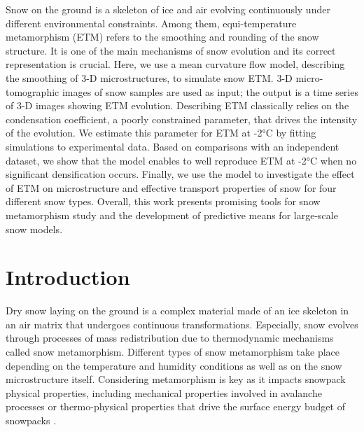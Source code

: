 \documentclass[draft,ms]{agujournal2019}
\begin{document}
Snow on the ground is a skeleton of ice and air evolving continuously under different environmental constraints. Among them, equi-temperature metamorphism (ETM) refers to the smoothing and rounding of the snow structure. It is one of the main mechanisms of snow evolution and its correct representation is crucial. Here, we use a mean curvature flow model, describing the smoothing of 3-D microstructures, to simulate snow ETM. 3-D micro-tomographic images of snow samples are used as input; the output is a time series of 3-D images showing ETM evolution. Describing ETM classically relies on the condensation coefficient, a poorly constrained parameter, that drives the intensity of the evolution. We estimate this parameter for ETM at -2°C by fitting simulations to experimental data. Based on comparisons with an independent dataset, we show that the model enables to well reproduce ETM at -2°C when no significant densification occurs. Finally, we use the model to investigate the effect of ETM on microstructure and effective transport properties of snow for four different snow types. Overall, this work presents promising tools for snow metamorphism study and the development of predictive means for large-scale snow models.

\section{Introduction}
\label{sec:intro}
Dry snow laying on the ground is a complex material made of an ice skeleton in an air matrix that undergoes continuous transformations. Especially, snow evolves through processes of mass redistribution due to thermodynamic mechanisms called snow metamorphism. Different types of snow metamorphism take place depending on the temperature and humidity conditions as well as on the snow microstructure itself. Considering metamorphism is key as it impacts snowpack physical properties, including mechanical properties involved in avalanche processes or thermo-physical properties that drive the surface energy budget of snowpacks \cite{lehning_physical_2002, vionnet_detailed_2012}.\\
\end{document}
